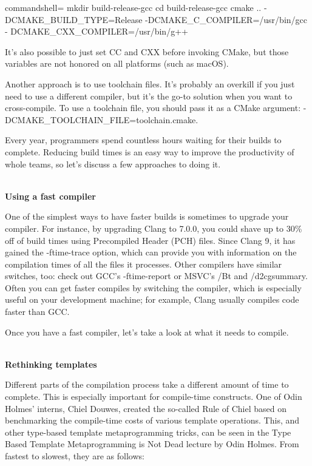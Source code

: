 \begin{tcblisting}{commandshell={}}
mkdir build-release-gcc
cd build-release-gcc
cmake .. -DCMAKE_BUILD_TYPE=Release -DCMAKE_C_COMPILER=/usr/bin/gcc -
DCMAKE_CXX_COMPILER=/usr/bin/g++
\end{tcblisting}

It's also possible to just set CC and CXX before invoking CMake, but those variables are not honored on all platforms (such as macOS).

Another approach is to use toolchain files. It's probably an overkill if you just need to use a different compiler, but it's the go-to solution when you want to cross-compile. To use a toolchain file, you should pass it as a CMake argument: -DCMAKE\_TOOLCHAIN\_FILE=toolchain.cmake. 


Every year, programmers spend countless hours waiting for their builds to complete. Reducing build times is an easy way to improve the productivity of whole teams, so let's discuss a few approaches to doing it.

\hspace*{\fill} \\ %
\noindent
\textbf{Using a fast compiler}

One of the simplest ways to have faster builds is sometimes to upgrade your compiler. For instance, by upgrading Clang to 7.0.0, you could shave up to 30\% off of build times using Precompiled Header (PCH) files. Since Clang 9, it has gained the -ftime-trace option, which can provide you with information on the compilation times of all the files it processes. Other compilers have similar switches, too: check out GCC's -ftime-report or MSVC's /Bt and /d2cgsummary. Often you can get faster compiles by switching the compiler, which is especially useful on your development machine; for example, Clang usually compiles code faster than GCC.

Once you have a fast compiler, let's take a look at what it needs to compile.

\hspace*{\fill} \\ %
\noindent
\textbf{Rethinking templates}

Different parts of the compilation process take a different amount of time to complete. This is especially important for compile-time constructs. One of Odin Holmes' interns, Chiel Douwes, created the so-called Rule of Chiel based on benchmarking the compile-time costs of various template operations. This, and other type-based template metaprogramming tricks, can be seen in the Type Based Template Metaprogramming is Not Dead lecture by Odin Holmes. From fastest to slowest, they are as follows:

